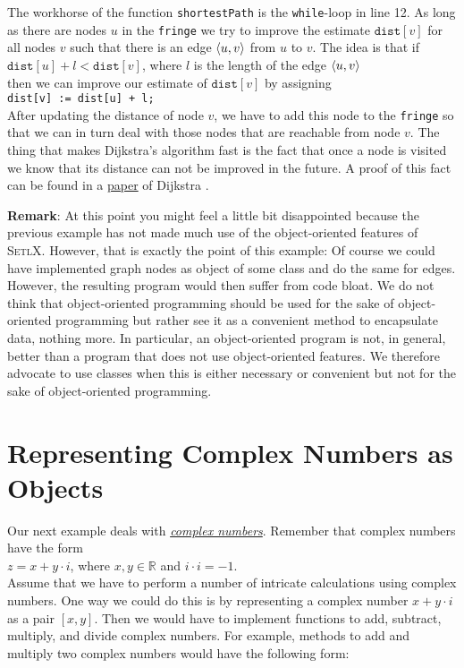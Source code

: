 The workhorse of the function \texttt{shortestPath} is the \texttt{while}-loop in line 12.  As long
as there are nodes $u$ in the \texttt{fringe} we try to improve the estimate $\mathtt{dist}[v]$ for
all nodes $v$ such that there is an edge $\pair(u,v)$ from $u$ to $v$.  The idea is that if 
\\[0.2cm]
\hspace*{1.3cm}
$\mathtt{dist}[u] + l < \mathtt{dist}[v]$, \quad where $l$ is the length of the edge $\pair(u,v)$
\\[0.2cm]
then we can improve our estimate of $\texttt{dist}[v]$ by assigning
\\[0.2cm]
\hspace*{1.3cm}
\texttt{dist[v] := dist[u] + l;}
\\[0.2cm]
After updating the distance of node $v$, we have to add this node to the \texttt{fringe} so that we
can in turn deal with those nodes that are reachable from node $v$.  The thing that makes Dijkstra's
algorithm fast is the fact that once a node is visited we know that its distance can not be improved
in the future.  A proof of this fact can be found in a 
\href{http://www-m3.ma.tum.de/foswiki/pub/MN0506/WebHome/dijkstra.pdf}{paper} of Dijkstra \cite{dijkstra:59}.
\vspace*{0.3cm}

\noindent
\textbf{Remark}:  At this point you might feel a little bit disappointed because the previous example
has not made much use of the object-oriented features of \textsc{SetlX}.  However, that is exactly
the point of this example: Of course we could have implemented graph nodes as object of some class
and do the same for edges.  However, the resulting program would then suffer from code bloat.  We do
not think that object-oriented programming should be used for the sake of object-oriented
programming but rather see it as a convenient method to encapsulate data, nothing more.  In
particular, an object-oriented program is not, in general, better than a program that does not use
object-oriented features.  We therefore advocate to use classes when this is either necessary or 
convenient but not for the sake of object-oriented programming.

\section{Representing Complex Numbers as Objects}
Our next example deals with 
\href{http://en.wikipedia.org/wiki/Complex_number}{\emph{complex numbers}}.  
Remember that complex numbers have the form
\\[0.2cm]
\hspace*{1.3cm}
$z = x + y \cdot i$, \quad where $x,y \in \mathbb{R}$ and $i \cdot i = -1$.
\\[0.2cm]
Assume that we have to perform a number of intricate calculations using complex numbers.  One way
we could do this is by representing a complex number $x + y \cdot i$ as a pair $[x,y]$.  Then we
would have to implement functions to add, subtract, multiply,  and divide complex numbers.  For
example, methods to add and multiply two complex numbers would have the following form: 

